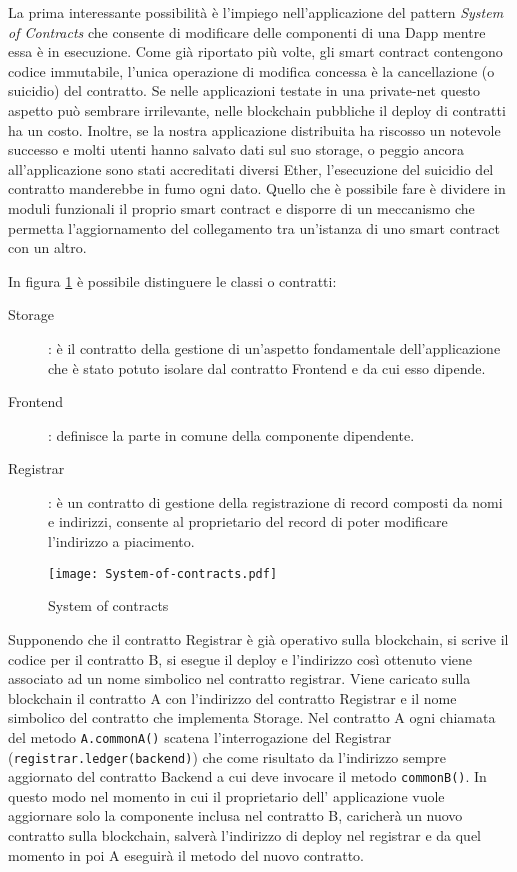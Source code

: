	La prima interessante possibilità è l'impiego nell'applicazione del pattern \textit{System of Contracts} che consente di modificare delle componenti di una Dapp mentre essa è in esecuzione. Come già riportato più volte, gli smart contract contengono codice immutabile, l'unica operazione di modifica concessa è la cancellazione (o suicidio) del contratto. Se nelle applicazioni testate in una private-net questo aspetto può sembrare irrilevante, nelle blockchain pubbliche il deploy di contratti ha un costo. Inoltre, se la nostra applicazione distribuita ha riscosso un notevole successo e molti utenti hanno salvato dati sul suo storage, o peggio ancora all'applicazione sono stati accreditati diversi Ether, l'esecuzione del suicidio del contratto manderebbe in fumo ogni dato. 
	Quello che è possibile fare è dividere in moduli funzionali il proprio smart contract e disporre di un meccanismo che permetta l'aggiornamento del collegamento tra un'istanza di uno smart contract con un altro.
	
	In figura \ref{fig:system-of-contracts}	è possibile distinguere le classi o contratti:
	\begin{description}
		\item[Storage]: è il contratto della gestione di un'aspetto fondamentale dell'applicazione che è stato potuto isolare dal contratto Frontend e da cui esso dipende.
		\item[Frontend]: definisce la parte in comune della componente dipendente.
		\item[Registrar]: è un contratto di gestione della registrazione di record composti da nomi e indirizzi, consente al proprietario del record di poter modificare l'indirizzo a piacimento.
	\end{description}		

	\begin{figure}
		\caption{System of contracts}
		\centering
		\texttt{[image: System-of-contracts.pdf]}
		\label{fig:system-of-contracts}
	\end{figure}

	Supponendo che il contratto Registrar è già operativo sulla blockchain, si scrive il codice per il contratto B, si esegue il deploy e l'indirizzo così ottenuto viene associato ad un nome simbolico nel contratto registrar. Viene caricato sulla blockchain il contratto A con l'indirizzo del contratto Registrar e il nome simbolico del contratto che implementa Storage.
	Nel contratto A ogni chiamata del metodo \lstinline|A.commonA()| scatena l'interrogazione del Registrar (\lstinline|registrar.ledger(backend)|) che come risultato da l'indirizzo sempre aggiornato del contratto Backend a cui deve invocare il metodo  \lstinline|commonB()|. In questo modo nel momento in cui il proprietario dell' applicazione vuole aggiornare solo la componente inclusa nel contratto B, caricherà un nuovo contratto sulla blockchain, salverà l'indirizzo di deploy nel registrar e da quel momento in poi A eseguirà il metodo del nuovo contratto.
	

